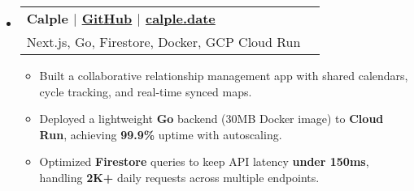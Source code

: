 \documentclass[letterpaper,11pt]{article}
\makeatletter
\newcommand{\resumeItem}[1]{
  \item{
    {#1}
  }
}
\newcommand{\resumeSubheading}[4]{
    \item
    \begin{tabular*}{0.985\textwidth}[t]{l@{\extracolsep{\fill}}r@{\hspace{-0.1in}}}
        {\textbf{#1}} & {#2} \\
        #3 &  #4 \\
    \end{tabular*}\vspace{-5pt}
}
\newcommand{\resumeSubHeadingListStart}{\begin{itemize}[leftmargin=0.00in, rightmargin=-0.2in, label={}]\vspace{3pt}}
\newcommand{\resumeSubHeadingListEnd}{\end{itemize}\vspace{-5pt}}
\newcommand{\resumeItemListStart}{\vspace{3pt}\begin{itemize}[leftmargin=0.15in, rightmargin=0.15in]}
\newcommand{\resumeItemListEnd}{\end{itemize}\vspace{-5pt}}
\makeatother
\begin{document}

\resumeSubHeadingListStart
\resumeSubheading
{\textbf{Calple} \textnormal{$|$ \href{https://github.com/juhun32/calple}{GitHub} $|$ \href{https://www.calple.date}{calple.date}}} {}
{{Next.js, Go, Firestore, Docker, GCP Cloud Run}}{}
\resumeItemListStart
\resumeItem{Built a collaborative relationship management app with shared calendars, cycle tracking, and real-time synced maps.}
\resumeItem{Deployed a lightweight \textbf{Go} backend (30MB Docker image) to \textbf{Cloud Run}, achieving \textbf{99.9\%} uptime with autoscaling.}
\resumeItem{Optimized \textbf{Firestore} queries to keep API latency \textbf{under 150ms}, handling \textbf{2K+} daily requests across multiple endpoints.}
\resumeItemListEnd
\resumeSubHeadingListEnd


\end{document}
